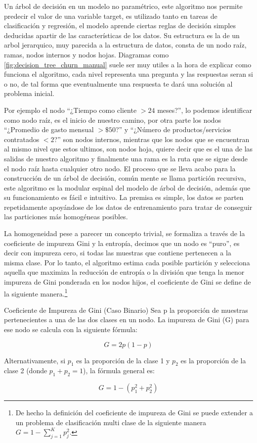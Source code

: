 Un árbol de decisión en un modelo no paramétrico, este algoritmo nos permite predecir el valor de una variable target, es utilizado tanto en tareas de clasificación y regresión, el modelo aprende ciertas reglas de decisión simples deducidas apartir de las características de los datos. Su estructura es la de un arbol jerarquico, muy parecida a la estructura de datos, consta de un nodo raíz, ramas, nodos internos y nodos hojas. Diagramas como \ref{fig:decision_tree_churn_manual} suele ser muy utiles a la hora de explicar como funciona el algoritmo, cada nivel representa una pregunta y las respuestas seran si o no, de tal forma que eventualmente una respuesta te dará una solución al problema inicial. 

Por ejemplo el nodo ``¿Tiempo como cliente $> 24$ meses?'', lo podemos identificar como nodo raíz, es el inicio de nuestro camino, por otra parte los nodos ``¿Promedio de gasto mensual $> \$50$?'' y ``¿Número de productos/servicios contratados $< 2$?'' son nodos internos, mientras que los nodos que se encuentran al mismo nivel que estos ultimos, son nodos hoja, quiere decir que es el una de las salidas de nuestro algoritmo y finalmente una rama es la ruta que se sigue desde el nodo raíz hasta cualquier otro nodo. El proceso que se lleva acabo para la construcción de un árbol de decisión, común mente se llama partición recursiva, este algoritmo es la modular espinal del modelo de árbol de decisión, además que su funcionamiento es fácil e intuitivo. La premisa es simple, los datos se parten repetidamente apoyándose de los datos de entrenamiento para tratar de conseguir las particiones más homogéneas posibles. 

La homogeneidad pese a parecer un concepto trivial, se formaliza a través de la coeficiente de impureza Gini y la entropía, decimos que un nodo es ``puro'', es decir con impureza cero, si todas las muestras que contiene pertenecen a la misma clase. Por lo tanto, el algoritmo estima cada posible partición y selecciona aquella que maximiza la reducción de entropía o la división que tenga la menor impureza de Gini ponderada en los nodos hijos, el coeficiente de Gini se define de la siguiente manera.\footnote{De hecho la definición del coeficiente de impureza de Gini se puede extender a un problema de clasificación multi clase de la siguiente manera $G=1-\sum_{j=1}^{K}p^2_j$. }

\begin{definicion}{Coeficiente de Impureza de Gini (Caso Binario)}
	Sea p la proporción de muestras pertenecientes a una de las dos clases en un nodo. La impureza de Gini (G) para ese nodo se calcula con la siguiente fórmula:
	
	\[ G = 2p(1-p) \]
	
	Alternativamente, si $p_1$ es la proporción de la clase 1 y $p_2$ es la proporción de la clase 2 (donde $p_1 + p_2 = 1$), la fórmula general es:
	
	\[ G = 1 - (p_1^2 + p_2^2) \] 
\end{definicion}



